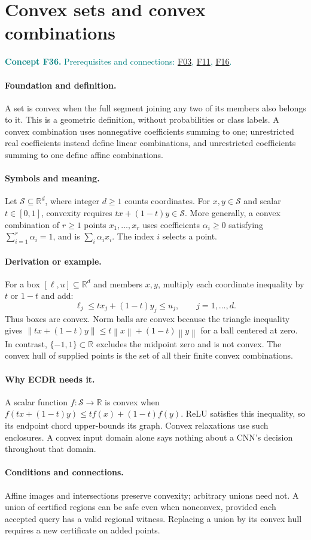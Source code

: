 \documentclass[11pt,a4paper]{article}
\newcommand{\R}{\mathbb R}
\newcommand{\norm}[1]{\left\lVert#1\right\rVert}
\newcommand{\conceptid}{Front matter}
\newcommand{\concept}[3]{\clearpage\renewcommand{\conceptid}{#1}%
\section{#2}\label{concept:#1}%
\textcolor{teal}{\textbf{Concept #1.} Prerequisites and connections: #3.}\par
\typeout{ECDR-CONCEPT-START #1 PAGE=\thepage}}
\begin{document}
\concept{F36}{Convex sets and convex combinations}{\hyperref[concept:F03]{F03}, \hyperref[concept:F11]{F11}, \hyperref[concept:F16]{F16}}
\paragraph{Foundation and definition.}
A set is convex when the full segment joining any two of its members
also belongs to it. This is a geometric definition, without probabilities
or class labels. A convex combination uses nonnegative coefficients
summing to one; unrestricted real coefficients instead define linear
combinations, and unrestricted coefficients summing to one define affine
combinations.
\paragraph{Symbols and meaning.}
Let $\mathcal S\subseteq\R^d$, where integer $d\ge1$ counts
coordinates. For $x,y\in\mathcal S$ and scalar $t\in[0,1]$,
convexity requires $tx+(1-t)y\in\mathcal S$. More generally, a convex
combination of $r\ge1$ points $x_1,\ldots,x_r$ uses coefficients
$\alpha_i\ge0$ satisfying $\sum_{i=1}^{r}\alpha_i=1$, and is
$\sum_i\alpha_i x_i$. The index $i$ selects a point.
\paragraph{Derivation or example.}
For a box $[\ell,u]\subseteq\R^d$ and members $x,y$, multiply each
coordinate inequality by $t$ or $1-t$ and add:
\[
 \ell_j\le tx_j+(1-t)y_j\le u_j,
 \qquad j=1,\ldots,d.
\]
Thus boxes are convex. Norm balls are convex because the triangle
inequality gives
$\norm{tx+(1-t)y}\le t\norm{x}+(1-t)\norm{y}$ for a ball centered
at zero. In contrast, $\{-1,1\}\subset\R$ excludes the midpoint
zero and is not convex. The convex hull of supplied points is the set
of all their finite convex combinations.
\paragraph{Why ECDR needs it.}
A scalar function $f:\mathcal S\to\R$ is convex when
$f(tx+(1-t)y)\le tf(x)+(1-t)f(y)$. ReLU satisfies this inequality,
so its endpoint chord upper-bounds its graph. Convex relaxations use
such enclosures. A convex input domain alone says nothing about a CNN's
decision throughout that domain.
\paragraph{Conditions and connections.}
Affine images and intersections preserve convexity; arbitrary unions
need not. A union of certified regions can be safe even when nonconvex,
provided each accepted query has a valid regional witness. Replacing a
union by its convex hull requires a new certificate on added points.
\par\label{endconcept:F36}
\end{document}
